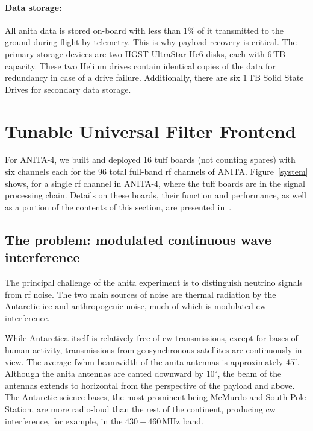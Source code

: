 \paragraph{Data storage:}
All \gls{anita} data is stored on-board with less than 1\% of it transmitted to the ground during flight by telemetry. This is why payload recovery is critical. 
The primary storage devices are two
HGST UltraStar He6 disks, each with $6\,\mathrm{TB}$ capacity. 
These two Helium
drives contain identical copies of the data for redundancy in case of a drive failure.
Additionally, there are six $1\,\mathrm{TB}$ Solid State Drives for secondary data storage. 

\section{Tunable Universal Filter Frontend}
\label{tuff}

For ANITA-4, we built and deployed 16 \gls{tuff} boards (not counting spares) with 
six channels each for the 96 total full-band \gls{rf} channels of ANITA. 
Figure~\ref{system} shows, for a single \gls{rf} channel in ANITA-4, where 
the \gls{tuff} boards are in the signal processing chain. Details on these boards, their function and performance, as well as a portion of the contents of this section, are presented in~\cite{tuff}. 

\subsection{The problem: modulated continuous wave interference} 

The principal challenge of the \gls{anita} experiment is to distinguish neutrino signals from \gls{rf} noise. 
The two main sources of noise are thermal radiation by the Antarctic ice and anthropogenic noise, much of which is modulated \gls{cw} interference. 

While Antarctica itself is relatively free of \gls{cw} transmissions, except for bases of human activity, transmissions from geosynchronous satellites are continuously in view.
The average \gls{fwhm} beamwidth of the \gls{anita} antennas is approximately $45^{\circ}$.
Although the \gls{anita} antennas are canted downward by $10^{\circ}$, the beam of the antennas extends to horizontal from the perspective of the payload and
above.  
The Antarctic science bases, the most prominent being McMurdo and South Pole Station, are more radio-loud than the rest of the continent, producing \gls{cw} interference, for example, in the $430-460\,\mbox{MHz}$ band. 

